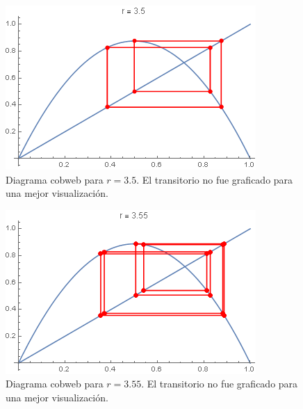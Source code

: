 \documentclass[aps,prb,twocolumn,superscriptaddress,floatfix,longbibliography]{revtex4-2}
\newcounter{para}
\begin{document}
\begin{figure}[htp]
    \includegraphics[clip=true,width=0.7\columnwidth]{b.cobweb.r_3.5.png}
    \caption{Diagrama cobweb para $r=3.5$. El transitorio no fue graficado para una mejor visualización.}
     \label{fig:b.cobweb.r_3.5}
\end{figure}

\begin{figure}[htp]
    \includegraphics[clip=true,width=0.7\columnwidth]{b.cobweb.r_3.55.png}
    \caption{Diagrama cobweb para $r=3.55$. El transitorio no fue graficado para una mejor visualización.}
     \label{fig:b.cobweb.r_3.55}
\end{figure}

\end{document}
